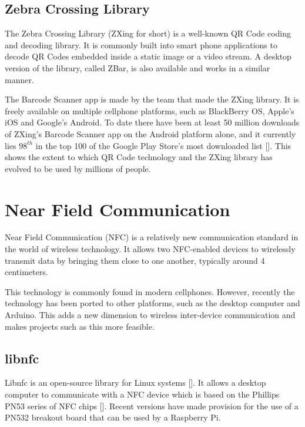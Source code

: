 \subsection{Zebra Crossing Library}
\label{sec:zbar}

The Zebra Crossing Library (ZXing for short) is a well-known QR Code coding and decoding
library. It is commonly built into smart phone applications to decode QR Codes embedded inside
a static image or a video stream. A desktop version of the library, called ZBar, is also
available and works in a similar manner. 

The Barcode Scanner app is made by the team that made the ZXing library. It is freely
available on multiple cellphone platforms, such as BlackBerry OS, Apple's iOS and Google's
Android. To date there have been at least 50 million downloads of ZXing's Barcode Scanner
app on the Android platform alone, and it currently lies $98^{th}$ in the top 100 of the Google Play
Store's most downloaded list [\cite{website:barcodescanner}]. This shows the extent to
which QR Code technology and the ZXing library has evolved to be used by millions of
people.

\section{Near Field Communication}

Near Field Communication (NFC) is a relatively new communication standard in the world of
wireless technology. It allows two NFC-enabled devices to wirelessly transmit data by bringing
them close to one another, typically around 4 centimeters.

This technology is commonly found in modern cellphones. However, recently the technology has
been ported to other platforms, such as the desktop computer and Arduino. This adds a new
dimension to wireless inter-device communication and makes projects such as this more
feasible.

\subsection{libnfc}

Libnfc is an open-source library for Linux systems [\cite{website:libnfc}]. It allows a
desktop computer to communicate with a NFC device which is based on the Phillips PN53
series of NFC chips [\cite{website:libnfc-hardware}]. Recent versions have made provision
for the use of a PN532 breakout board that can be used by a Raspberry Pi. 

